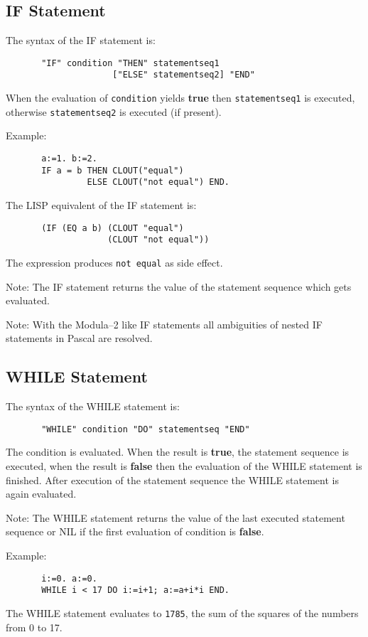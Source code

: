 \subsection{IF Statement}
   
The syntax of the IF statement is:
\begin{verbatim}
       "IF" condition "THEN" statementseq1 
                     ["ELSE" statementseq2] "END" 
\end{verbatim}

When the evaluation of \verb/condition/ yields
{\bf true} then \verb/statementseq1/ is executed,
otherwise \verb/statementseq2/ is executed (if present).

Example:
\begin{verbatim}
       a:=1. b:=2.
       IF a = b THEN CLOUT("equal")
                ELSE CLOUT("not equal") END.
\end{verbatim}
{\small
The LISP equivalent of the IF statement is:
\begin{verbatim}
       (IF (EQ a b) (CLOUT "equal")
                    (CLOUT "not equal"))
\end{verbatim}
The expression produces \verb/not equal/ as side effect.
}

Note: The IF statement returns the value of the
statement sequence which gets evaluated.

Note: With the Modula--2 like IF statements all
ambiguities of nested IF statements in Pascal are resolved.


\subsection{WHILE Statement}
   
The syntax of the WHILE statement is:
\begin{verbatim}
       "WHILE" condition "DO" statementseq "END" 
\end{verbatim}
The condition is evaluated. When the result is {\bf true},
the statement sequence is executed, when 
the result is {\bf false} then the evaluation of the
WHILE statement is finished.
After execution of the statement sequence the
WHILE statement is again evaluated.

Note: The WHILE statement returns the value of the 
last executed statement sequence or NIL if 
the first evaluation of condition is {\bf false}. 

Example:
\begin{verbatim}
       i:=0. a:=0.
       WHILE i < 17 DO i:=i+1; a:=a+i*i END.
\end{verbatim}
The WHILE statement evaluates to \verb/1785/, the
sum of the squares of the numbers from 0 to 17.


